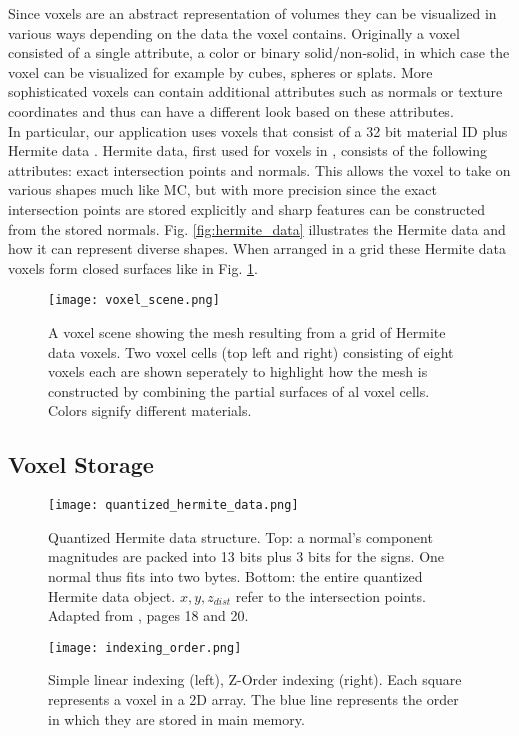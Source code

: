 Since voxels are an abstract representation of volumes they can be visualized in various ways depending on the data the voxel contains.
Originally a voxel consisted of a single attribute, a color or binary solid/non-solid, in which case the voxel can be visualized for example by cubes, spheres or splats.
More sophisticated voxels can contain additional attributes such as normals or texture coordinates and thus can have a different look based on these attributes.\\
In particular, our application uses voxels that consist of a 32 bit material ID plus Hermite data \cite{dual_contouring}. Hermite data, first used for voxels in \cite{dual_contouring},
consists of the following attributes: exact intersection points and normals. This allows the voxel to take on various shapes much like MC, but with more precision since the exact intersection points are stored explicitly and
sharp features can be constructed from the stored normals. Fig. \ref{fig:hermite_data} illustrates the Hermite data and how it can represent diverse shapes. When arranged in a grid these Hermite data voxels form closed surfaces
like in Fig. \ref{fig:voxel_scene}.

\begin{figure}
\centering
\captionsetup{width=0.8\textwidth}
\texttt{[image: voxel\_scene.png]}
\caption{A voxel scene showing the mesh resulting from a grid of Hermite data voxels. Two voxel cells (top left and right) consisting of eight voxels each are shown seperately to highlight how
the mesh is constructed by combining the partial surfaces of al voxel cells. Colors signify different materials.}
\label{fig:voxel_scene}
\end{figure}

\subsection{Voxel Storage}

\begin{figure}[!htb]
\texttt{[image: quantized\_hermite\_data.png]}
\caption{Quantized Hermite data structure. Top: a normal's component magnitudes are packed into 13 bits plus 3 bits for the signs. One normal thus fits into two bytes. Bottom: the entire quantized Hermite data object. $x,y,z_{dist}$ refer to the intersection points. Adapted from \cite{quantized_hermite_data}, pages 18 and 20.}
\label{fig:quantized_hermite_data}
\endminipage\hfill
{}
\vspace*{10mm}
\texttt{[image: indexing\_order.png]}
\vspace*{4mm}
\caption{Simple linear indexing (left), Z-Order indexing (right). Each square represents a voxel in a 2D array. The blue line represents the order in which they are stored in main memory.}
\label{fig:indexing_order}
\endminipage\hfill
\end{figure}

